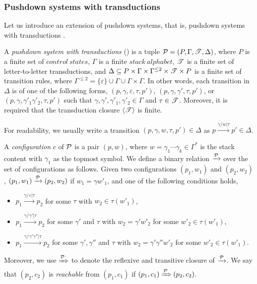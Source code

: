 \subsubsection{Pushdown systems with transductions}

Let us introduce an extension of pushdown systems, that is, pushdown systems with transductions \cite{UM13,Song18}. 

\begin{definition}[\TrPDS] \label{def:trpds}
    A \emph{pushdown system with transductions} (\TrPDS) is a tuple ${\mathcal{P} } = (P, \Gamma, {\mathscr{T} }, \Delta)$, 
    where $P$ is a finite set of $control\ states$, $\Gamma$ is a finite $stack\ alphabet$, ${\mathscr{T} }$ is a finite set of letter-to-letter transductions, and $\Delta \subseteq P \times \Gamma \times \Gamma^{\le 2} \times {\mathscr{T} } \times P$ is a finite set of transition rules, where $\Gamma^{\le 2} = \{\varepsilon\} \cup \Gamma \cup \Gamma \times \Gamma$. In other words, each transition in $\Delta$ is of one of the following forms, $(p, \gamma, \varepsilon, \tau, p')$, $(p, \gamma, \gamma',\tau, p')$, or $(p, \gamma, \gamma'_1 \gamma'_2, \tau, p')$ such that $\gamma, \gamma', \gamma'_1, \gamma'_2 \in \Gamma$ and $\tau \in {\mathscr{T} }$. 
   Moreover, it is required that the transduction closure $\langle {\mathscr{T} } \rangle$ is finite.  
\end{definition}
For readability, we usually write a transition $(p, \gamma, w, \tau, p') \in \Delta$ as $p \xrightarrow{\gamma/w | \tau} p' \in \Delta$.

A \emph{configuration} $c$ of ${\mathcal{P} }$ is a pair $(p, w)$, where $w = \gamma_1 \cdots \gamma_k \in \Gamma^*$ is the  stack content with $\gamma_1$ as the topmost symbol. We define a binary relation $\xrightarrow{{\mathcal{P} }}$ over the set of configurations as follows. Given two configurations $(p_1, w_1)$ and $(p_2, w_2)$, $(p_1, w_1) \xrightarrow{{\mathcal{P} }} (p_2, w_2)$ if $w_1 = \gamma w'_1$, and one of the following conditions holds,
\begin{itemize}
\item $p_1 \xrightarrow{\gamma/\varepsilon|\tau} p_2$ for some $\tau$ with  $w_2 \in \tau(w'_1)$, 
%
\item $p_1 \xrightarrow{\gamma/\gamma'|\tau} p_2$ for some $\gamma'$ and $\tau$ with $w_2 = \gamma' w'_2$ for some $w'_2 \in \tau(w'_1)$, 
%
\item $p_1 \xrightarrow{\gamma/\gamma' \gamma''|\tau} p_2$ for some $\gamma', \gamma''$ and $\tau$ with $w_2 = \gamma' \gamma'' w'_2$ for some $w'_2 \in \tau(w'_1)$.
\end{itemize}
Moreover, we use $\xRightarrow{{\mathcal{P} }}$ to denote the reflexive and transitive closure of $\xrightarrow{{\mathcal{P} }}$. We say that $(p_2, c_2)$ is \emph{reachable} from $(p_1, c_1)$ if $(p_1, c_1) \xRightarrow{{\mathcal{P} }} (p_2, c_2)$.

